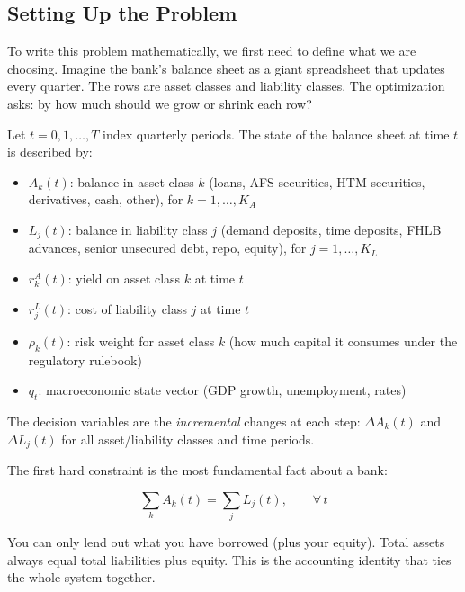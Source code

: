 \documentclass[12pt,a4paper]{article}
\begin{document}
\subsection{Setting Up the Problem}

To write this problem mathematically, we first need to define what we are
choosing.  Imagine the bank's balance sheet as a giant spreadsheet that updates
every quarter.  The rows are asset classes and liability classes.  The
optimization asks: by how much should we grow or shrink each row?

Let $t = 0, 1, \ldots, T$ index quarterly periods.  The state of the balance
sheet at time $t$ is described by:

\begin{itemize}[noitemsep]
  \item $A_k(t)$: balance in asset class $k$ (loans, AFS securities, HTM
        securities, derivatives, cash, other), for $k = 1,\ldots,K_A$
  \item $L_j(t)$: balance in liability class $j$ (demand deposits, time
        deposits, FHLB advances, senior unsecured debt, repo, equity),
        for $j = 1,\ldots,K_L$
  \item $r_k^A(t)$: yield on asset class $k$ at time $t$
  \item $r_j^L(t)$: cost of liability class $j$ at time $t$
  \item $\rho_k(t)$: risk weight for asset class $k$ (how much capital it
        consumes under the regulatory rulebook)
  \item $q_t$: macroeconomic state vector (GDP growth, unemployment, rates)
\end{itemize}

The decision variables are the \emph{incremental} changes at each step:
$\Delta A_k(t)$ and $\Delta L_j(t)$ for all asset/liability classes and
time periods.

The first hard constraint is the most fundamental fact about a bank:

\begin{equation}
  \sum_k A_k(t) = \sum_j L_j(t), \qquad \forall\, t
  \label{eq:bsi}
\end{equation}

\begin{mdframed}[style=plainenglish]
You can only lend out what you have borrowed (plus your equity).  Total assets
always equal total liabilities plus equity.  This is the accounting identity
that ties the whole system together.
\end{mdframed}
\end{document}
